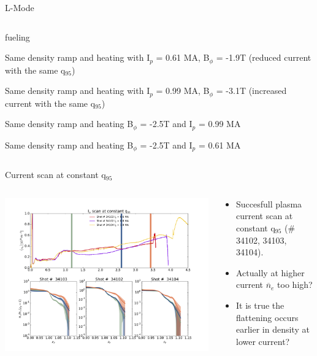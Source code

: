 \documentclass[10pt, compress]{beamer}
\newcommand\Fontvi{\fontsize{8}{7.2}\selectfont}
\begin{document}
\begin{frame}{L-Mode}
\begin{columns}
\begin{column}{0.5\textwidth}
\begin{description}
        fueling
      \item[\# 2] Same density ramp and heating with I$_p$ = 0.61 MA,
        B$_{\phi}$ = -1.9T (reduced current with the same q$_{95}$)
      \item[\# 3] Same density ramp and heating with I$_p$ = 0.99 MA,
        B$_{\phi}$ = -3.1T (increased current with the same q$_{95}$)
      \item[\# 4] Same density ramp and heating B$_{\phi}$ = -2.5T and I$_{p}$ = 0.99 MA
      \item[\# 5] Same density ramp and heating B$_{\phi}$ = -2.5T and I$_{p}$ = 0.61 MA
    \end{description}
  
  \end{column}
\end{columns}
\end{frame}

\begin{frame}{Current scan at constant q$_95$}
  \Fontvi
  \begin{columns}
    \begin{column}{0.6\textwidth}
      \includegraphics[width=\textwidth]{../../Experiments/AUG/analysis/pdfbox/IpConstantq95_density}
    \end{column}
    \begin{column}{0.4\textwidth}
      \begin{itemize}
        \item Succesfull plasma current scan at constant
          q$_{95}$ (\# 34102,  34103, 34104).
        \item Actually at higher current $\overline{n}_e$ too
          high?
        \item It is true the flattening occurs earlier in density at
          lower current?
      \end{itemize}
    \end{column}
  \end{columns}
  
\end{frame}
\end{document}
